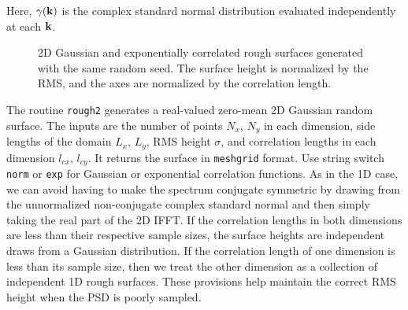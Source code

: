 Here, $\gamma(\mathbf{k})$ is the complex standard normal distribution evaluated independently at each $\mathbf{k}$.  

\begin{figure}[H] 
   \centering
   \caption{2D Gaussian and exponentially correlated rough surfaces generated with the same random seed. The surface height is normalized by the RMS, and the axes are normalized by the correlation length.}
\end{figure}


The routine \texttt{rough2} generates a real-valued zero-mean 2D Gaussian random surface. The inputs are the number of points $N_x$, $N_y$ in each dimension, side lengths of the domain $L_x$, $L_y$, RMS height $\sigma$, and correlation lengths in each dimension $l_{cx}$, $l_{cy}$. It returns the surface in \texttt{meshgrid} format. Use string switch \texttt{norm} or \texttt{exp} for Gaussian or exponential correlation functions. As in the 1D case, we can avoid having to make the spectrum conjugate symmetric by drawing from the unnormalized non-conjugate complex standard normal and then simply taking the real part of the 2D IFFT. If the correlation lengths in both dimensions are less than their respective sample sizes, the surface heights are independent draws from a Gaussian distribution. If the correlation length of one dimension is less than its sample size, then we treat the other dimension as a collection of independent 1D rough surfaces. These provisions help maintain the correct RMS height when the PSD is poorly sampled. 

